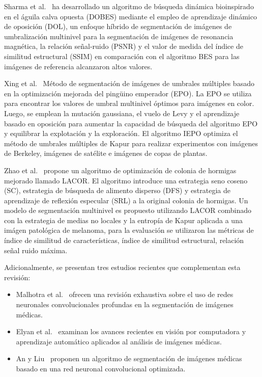 \documentclass[conference]{IEEEtran}
\begin{document}
\noindent Sharma et al.~\cite{Sharma2023} ha desarrollado un algoritmo de búsqueda dinámica bioinspirado en el águila calva opuesta (DOBES) mediante el empleo de aprendizaje dinámico de oposición (DOL), un enfoque híbrido de segmentación de imágenes de umbralización multinivel para la segmentación de imágenes de resonancia magnética, la relación señal-ruido (PSNR) y el valor de medida del índice de similitud estructural (SSIM) en comparación con el algoritmo BES para las imágenes de referencia alcanzaron altos valores.

\noindent Xing et al.~\cite{Xing2020} Método de segmentación de imágenes de umbrales múltiples basado en la optimización mejorada del pingüino emperador (EPO). La EPO se utiliza para encontrar los valores de umbral multinivel óptimos para imágenes en color. Luego, se emplean la mutación gaussiana, el vuelo de Levy y el aprendizaje basado en oposición para aumentar la capacidad de búsqueda del algoritmo EPO y equilibrar la explotación y la exploración. El algoritmo IEPO optimiza el método de umbrales múltiples de Kapur para realizar experimentos con imágenes de Berkeley, imágenes de satélite e imágenes de copas de plantas.

\noindent Zhao et al.~\cite{Zhao2023} propone un algoritmo de optimización de colonia de hormigas mejorado llamado LACOR. El algoritmo introduce una estrategia seno coseno (SC), estrategia de búsqueda de alimento disperso (DFS) y estrategia de aprendizaje de reflexión especular (SRL) a la original colonia de hormigas. Un modelo de segmentación multinivel es propuesto utilizando LACOR combinado con la estrategia de medias no locales y la entropía de Kapur aplicada a una imágen patológica de melanoma, para la evaluación se utilizaron las métricas de índice de similitud de características, índice de similitud estructural, relación señal ruido máxima.


\noindent Adicionalmente, se presentan tres estudios recientes que complementan esta revisión:

\begin{itemize}
	\item Malhotra et al.~\cite{Chakraborty2022} ofrecen una revisión exhaustiva sobre el uso de redes neuronales convolucionales profundas en la segmentación de imágenes médicas.
	\item Elyan et al.~\cite{Elyan2022} examinan los avances recientes en visión por computadora y aprendizaje automático aplicados al análisis de imágenes médicas.
	\item An y Liu~\cite{An2020} proponen un algoritmo de segmentación de imágenes médicas basado en una red neuronal convolucional optimizada.
\end{itemize}
\end{document}
